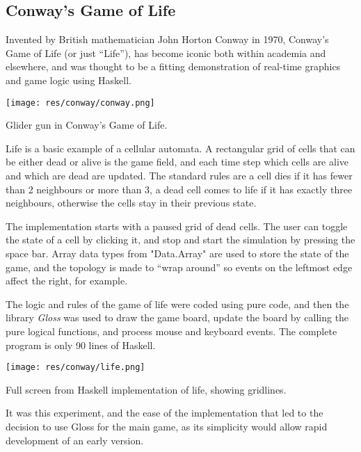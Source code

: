 \subsection{Conway's Game of Life}

Invented by British mathematician John Horton Conway in 1970, Conway's Game of Life (or just ``Life''), has become iconic both within academia and elsewhere, and was thought to be a fitting demonstration of real-time graphics and game logic using Haskell. 

\begin{marginfigure}
	\texttt{[image: res/conway/conway.png]}
	\caption[Glider gun in Conway's Game of Life]{Glider gun in Conway's Game of Life.}
	\label{fig:glidergun}
\end{marginfigure}

Life is a basic example of a cellular automata. A rectangular grid of cells that can be either dead or alive is the game field, and each time step which cells are alive and which are dead are updated. The standard rules are a cell dies if it has fewer than 2 neighbours or more than 3, a dead cell comes to life if it has exactly three neighbours, otherwise the cells stay in their previous state.

The implementation starts with a paused grid of dead cells. The user can toggle the state of a cell by clicking it, and stop and start the simulation by pressing the space bar. Array data types from "Data.Array" are used to store the state of the game, and the topology is made to ``wrap around'' so events on the leftmost edge affect the right, for example.

The logic and rules of the game of life were coded using pure code, and then the library \emph{Gloss} was used to draw the game board, update the board by calling the pure logical functions, and process mouse and keyboard events. The complete program is only 90 lines of Haskell.

\begin{marginfigure}
	\hspace{-1em}\texttt{[image: res/conway/life.png]}
	\caption[Full screen from Haskell implementation of Life]{Full screen from Haskell implementation of life, showing gridlines.}
	\label{fig:life}
\end{marginfigure}

It was this experiment, and the ease of the implementation that led to the decision to use Gloss for the main game, as its simplicity would allow rapid development of an early version.
